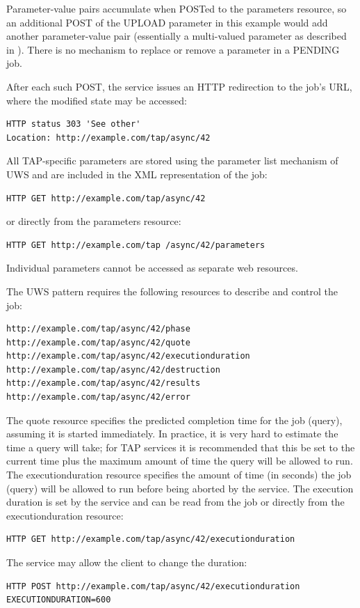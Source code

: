 \documentclass[11pt,letter]{ivoa}
\begin{document}
Parameter-value pairs accumulate when POSTed to the parameters resource, so an 
additional POST of the UPLOAD parameter in this example would add another 
parameter-value pair (essentially a multi-valued parameter as described in 
\citep{std:DALI}). There is no mechanism to replace or remove a parameter in a 
PENDING job.

After each such POST, the service issues an HTTP redirection to the job's URL, 
where the modified state may be accessed:

\begin{verbatim}
HTTP status 303 'See other'
Location: http://example.com/tap/async/42
\end{verbatim}


All TAP-specific parameters are stored using the parameter list mechanism of 
UWS and are included in the XML representation of the job:
\begin{verbatim}
HTTP GET http://example.com/tap/async/42
\end{verbatim}
or directly from the parameters resource:
\begin{verbatim}
HTTP GET http://example.com/tap /async/42/parameters
\end{verbatim}
Individual parameters cannot be accessed as separate web resources.

The UWS pattern requires the following resources to describe and control the 
job:
\begin{verbatim}
http://example.com/tap/async/42/phase
http://example.com/tap/async/42/quote
http://example.com/tap/async/42/executionduration
http://example.com/tap/async/42/destruction
http://example.com/tap/async/42/results
http://example.com/tap/async/42/error
\end{verbatim}
The quote resource specifies the predicted completion time for the job (query), 
assuming it is started immediately. In practice, it is very hard to estimate the 
time a query will take; for TAP services it is recommended that this be set to 
the current time plus the maximum amount of time the query will be allowed to 
run. The executionduration resource specifies the amount of time (in seconds) 
the job (query) will be allowed to run before being aborted by the service. The 
execution duration is set by the service and can be read from the job or 
directly from the executionduration resource:

\begin{verbatim}
HTTP GET http://example.com/tap/async/42/executionduration
\end{verbatim}
The service may allow the client to change the duration:
\begin{verbatim}
HTTP POST http://example.com/tap/async/42/executionduration
EXECUTIONDURATION=600
\end{verbatim}
\end{document}
